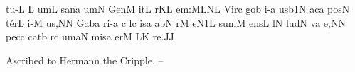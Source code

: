 \sgn t{u}{-}\punctum L\egn
\custos L\lineaproxima
\sgn {}um\punctum L\egn
\spatium
\sgn s{a}n\punctum a\egn
{}um\punctum N\egn
\spatium
\sgn Gen\punctum M\egn
\sgn {}it\punctum L\egn
{}r\pes KL\egn
\sgn {}e{m:}\clivis ML\augmentumduplex NL\egn
\spatium
\divisiomaior
\spatium
\sgn V{i}r\punctum c\egn
\sgn go{}\punctum b\egn
\spatium
{}i{-}\punctum a\egn
\sgn {}us\episem b1\punctum N\egn
\spatium
\sgn {}ac\punctum a\egn
\spatium
\sgn pos\punctum N\egn
\sgn t{\'e}r\punctum L\egn
\sgn {}i{-}\punctum M\egn
\sgn {}u{s,}\punctum N\augmentum N\egn
\spatium
\divisiominor
\spatium
\sgn Gab\punctum a\egn
\sgn ri{-}\punctum a\egn
\custos c
\lineaproxima
{}l\punctum c\egn
\sgn {}is\punctum a\egn
\spatium
\sgn {}ab\punctum N\egn
\spatium
{}r\punctum M\egn
\sgn {}e{}\episem N1\punctum L\egn
\spatium
\divisiominor
\spatium
\sgn s{u}m\punctum M\egn
\sgn {}e{ns}\punctum L\egn
\spatium
{}l\punctum N\egn
\sgn lud\punctum N\egn
\spatium
{}v\punctum a\egn
\sgn {}e,\punctum N\augmentum N\egn
\spatium
\divisiominor
\spatium
\sgn pec\punctum c\egn
\sgn cat\punctum b\egn
{}r\punctum c\egn
\sgn {}um\clivis aN\egn
\spatium
\sgn mis\punctum a\egn
\sgn {}er\punctum M\egn
{}\clivis LK\egn
\sgn re.\punctum J\augmentum J\egn
\spatium
\Finisgregoriana


\bigskip

\source Ascribed to Hermann the Cripple, {}--


